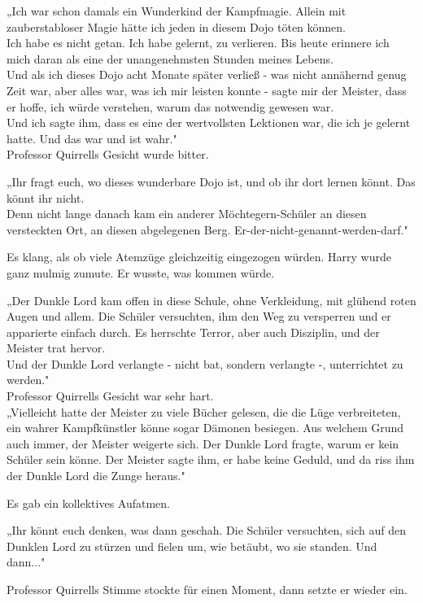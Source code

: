 {„Ich war schon damals ein Wunderkind der Kampfmagie. Allein mit zauberstabloser Magie hätte ich jeden in diesem Dojo töten können.\\ Ich habe es nicht getan. Ich habe gelernt, zu verlieren. Bis heute erinnere ich mich daran als eine der unangenehmsten Stunden meines Lebens.\\ Und als ich dieses Dojo acht Monate später verließ - was nicht annähernd genug Zeit war, aber alles war, was ich mir leisten konnte - sagte mir der Meister, dass er hoffe, ich würde verstehen, warum das notwendig gewesen war.\\ Und ich sagte ihm, dass es eine der wertvollsten Lektionen war, die ich je gelernt hatte. Und das war und ist wahr."\\ Professor Quirrells Gesicht wurde bitter.

„Ihr fragt euch, wo dieses wunderbare Dojo ist, und ob ihr dort lernen könnt. Das könnt ihr nicht.\\ Denn nicht lange danach kam ein anderer Möchtegern-Schüler an diesen versteckten Ort, an diesen abgelegenen Berg. Er-der-nicht-genannt-werden-darf."

Es klang, als ob viele Atemzüge gleichzeitig eingezogen würden. Harry wurde ganz mulmig zumute. Er wusste, was kommen würde.

„Der Dunkle Lord kam offen in diese Schule, ohne Verkleidung, mit glühend roten Augen und allem. Die Schüler versuchten, ihm den Weg zu versperren und er apparierte einfach durch. Es herrschte Terror, aber auch Disziplin, und der Meister trat hervor.\\ Und der Dunkle Lord verlangte - nicht bat, sondern verlangte -, unterrichtet zu werden."\\ Professor Quirrells Gesicht war sehr hart.\\ „Vielleicht hatte der Meister zu viele Bücher gelesen, die die Lüge verbreiteten, ein wahrer Kampfkünstler könne sogar Dämonen besiegen. Aus welchem Grund auch immer, der Meister weigerte sich. Der Dunkle Lord fragte, warum er kein Schüler sein könne. Der Meister sagte ihm, er habe keine Geduld, und da riss ihm der Dunkle Lord die Zunge heraus."

Es gab ein kollektives Aufatmen.

„Ihr könnt euch denken, was dann geschah. Die Schüler versuchten, sich auf den Dunklen Lord zu stürzen und fielen um, wie betäubt, wo sie standen. Und dann..."

Professor Quirrells Stimme stockte für einen Moment, dann setzte er wieder ein.

}
